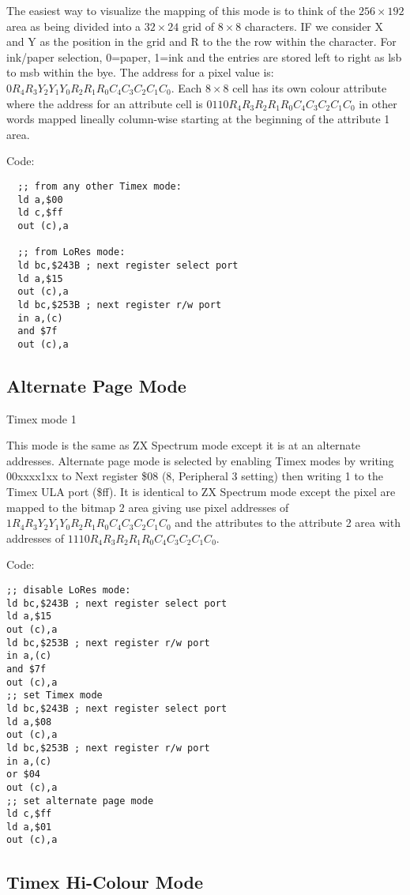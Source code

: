 The easiest way to visualize the mapping of this mode is to think of
the $256\times192$ area as being divided into a $32\times24$ grid of
$8\times8$ characters.  IF we consider X and Y as the position in the
grid and R to the the row within the character.  For ink/paper
selection, 0=paper, 1=ink and the entries are stored left to right as
lsb to msb within the bye.  The address for a pixel value is:
$0R_4R_3Y_2Y_1Y_0R_2R_1R_0C_4C_3C_2C_1C_0$. Each $8\times8$ cell has
its own colour attribute where the address for an attribute cell is
$0110R_4R_3R_2R_1R_0C_4C_3C_2C_1C_0$ in other words mapped lineally
column-wise starting at the beginning of the attribute 1 area.

Code:
\begin{verbatim}
  ;; from any other Timex mode:
  ld a,$00
  ld c,$ff
  out (c),a

  ;; from LoRes mode:
  ld bc,$243B ; next register select port
  ld a,$15
  out (c),a
  ld bc,$253B ; next register r/w port
  in a,(c)
  and $7f
  out (c),a
\end{verbatim}

\subsection{Alternate Page Mode}

Timex mode 1

This mode is the same as ZX Spectrum mode except it is at an alternate
addresses. Alternate page mode is selected by enabling Timex modes by
writing 00xxxx1xx to Next register \$08 (8, Peripheral 3 setting) then
writing 1 to the Timex ULA port (\$ff).  It is identical to ZX
Spectrum mode except the pixel are mapped to the bitmap 2 area giving
use pixel addresses of $1R_4R_3Y_2Y_1Y_0R_2R_1R_0C_4C_3C_2C_1C_0$ and
the attributes to the attribute 2 area with addresses of
$1110R_4R_3R_2R_1R_0C_4C_3C_2C_1C_0$.

Code:

\begin{verbatim}
;; disable LoRes mode:
ld bc,$243B ; next register select port
ld a,$15
out (c),a
ld bc,$253B ; next register r/w port
in a,(c)
and $7f
out (c),a
;; set Timex mode
ld bc,$243B ; next register select port
ld a,$08
out (c),a
ld bc,$253B ; next register r/w port
in a,(c)
or $04
out (c),a
;; set alternate page mode
ld c,$ff
ld a,$01
out (c),a
\end{verbatim}

\subsection{Timex Hi-Colour Mode}

